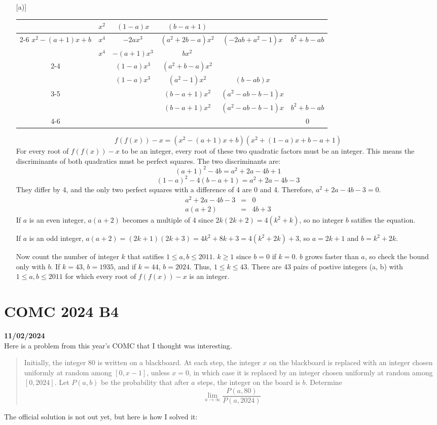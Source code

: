 \documentclass[12pt, oneside]{article}
\begin{document}
\begin{enumerate} [a)]
\begin{center}
\addtolength{\rightskip}{-2cm}
\begin{tabular} {cccccc}
&$x^2$&$(1-a)x$&$(b-a+1)$&&\\
\cline{2-6}
\multicolumn{1}{c|} {$x^2 - (a+1)x + b$} & $x^4$ & $-2ax^3$ & $(a^2+2b-a)x^2$ & $(-2ab+a^2-1)x$ & $b^2 + b - ab$\\
& $x^4$ & $-(a+1)x^3$ & $bx^2$ &&\\
\cline{2-4}
 && $(1-a)x^3$ & $(a^2+b-a)x^2$ &&\\
&& $(1-a)x^3$ & $(a^2-1)x^2$ &$(b-ab)x$&\\
\cline{3-5}
&&&$(b-a+1)x^2$&$(a^2-ab-b-1)x$&\\
&&&$(b-a+1)x^2$&$(a^2-ab-b-1)x$&$b^2 + b - ab$\\
\cline{4-6}
&&&&&0
\end{tabular}
\end{center}
\[f(f(x)) - x = (x^2 - (a+1)x + b)(x^2+(1-a)x + b-a+1)\]
For every root of $f(f(x)) - x$ to be an integer, every root of these two quadratic factors must be an integer. This means the discriminants of both quadratics must be perfect squares. The two discriminants are:
\[(a+1)^2 - 4b = a^2 + 2a - 4b + 1\]
\[(1-a)^2 - 4(b-a+1) = a^2 + 2a - 4b - 3\]
They differ by 4, and the only two perfect squares with a difference of 4 are 0 and 4. Therefore, $a^2 + 2a - 4b - 3 = 0$.
\begin{eqnarray*}
a^2 + 2a - 4b - 3 &=& 0\\
a(a+2) &=& 4b + 3
\end{eqnarray*}
If $a$ is an even integer, $a(a+2)$ becomes a multiple of 4 since $2k(2k+2)=4(k^2+k)$, so no integer $b$ satifies the equation.

If $a$ is an odd integer, $a(a+2) = (2k+1)(2k+3) = 4k^2 + 8k + 3 = 4(k^2 + 2k) + 3$, so $a=2k+1$ and $b=k^2+2k$.

Now count the number of integer $k$ that satifies $1 \leq a,b \leq 2011$. $k \geq 1$ since $b = 0$ if $k = 0$. $b$ grows faster than $a$, so check the bound only with $b$. If $k=43$, $b=1935$, and if $k=44$, $b=2024$. Thus, $1 \leq k \leq 43$. There are 43 pairs of postive integers (a, b) with $1 \leq a, b \leq 2011$ for which every root of $f(f(x)) - x$ is an integer.
\end{enumerate}
\section*{COMC 2024 B4}
\textbf{11/02/2024}\\
Here is a problem from this year's COMC that I thought was interesting.
\begin{quote}
Initially, the integer 80 is written on a blackboard. At each step, the integer $x$ on the
blackboard is replaced with an integer chosen uniformly at random among $[0, x-1]$, unless
$x = 0$, in which case it is replaced by an integer chosen uniformly at random among $[0, 2024]$.
Let $P(a, b)$ be the probability that after $a$ steps, the integer on the board is $b$. Determine
\[ \lim_{a \rightarrow \infty} \frac{P(a, 80)}{P(a, 2024)}\]
\end{quote}
The official solution is not out yet, but here is how I solved it:
\end{document}
